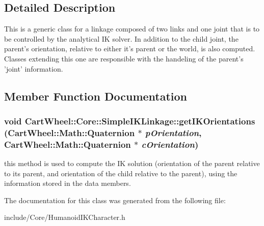 \subsection{Detailed Description}
This is a generic class for a linkage composed of two links and one joint that is to be controlled by the analytical IK solver. In addition to the child joint, the parent's orientation, relative to either it's parent or the world, is also computed. Classes extending this one are responsible with the handeling of the parent's 'joint' information. 

\subsection{Member Function Documentation}
\hypertarget{classCartWheel_1_1Core_1_1SimpleIKLinkage_a356d408ad86434710f311c013b318994}{
\subsubsection[{getIKOrientations}]{\setlength{\rightskip}{0pt plus 5cm}void CartWheel::Core::SimpleIKLinkage::getIKOrientations ({\bf CartWheel::Math::Quaternion} $\ast$ {\em pOrientation}, \/  {\bf CartWheel::Math::Quaternion} $\ast$ {\em cOrientation})}}
\label{classCartWheel_1_1Core_1_1SimpleIKLinkage_a356d408ad86434710f311c013b318994}
this method is used to compute the IK solution (orientation of the parent relative to its parent, and orientation of the child relative to the parent), using the information stored in the data members. 

The documentation for this class was generated from the following file:\begin{DoxyCompactItemize}
\item 
include/Core/HumanoidIKCharacter.h\end{DoxyCompactItemize}
